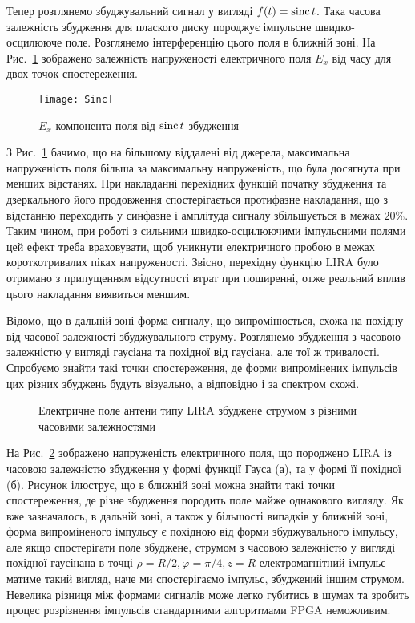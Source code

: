 Тепер розглянемо збуджувальний сигнал у вигляді $ f(t) = \operatorname{sinc} t $.
Така часова залежність збудження для плаского диску породжує імпульсне
швидко-осцилююче поле. Розглянемо інтерференцію цього поля в ближній зоні.
На Рис.~\ref{fig:ex_sinc} зображено залежність напруженості електричного 
поля $ E_x $ від часу для двох точок спостереження.

\begin{figure}[h] \begin{center}
\texttt{[image: Sinc]}
\caption{$ E_x $ компонента поля від $ \operatorname{sinc} t $ збудження}
\label{fig:ex_sinc}
\end{center} \end{figure}

З Рис.~\ref{fig:ex_sinc} бачимо, що на більшому віддалені від джерела, 
максимальна напруженість поля більша за максимальну напруженість, що була 
досягнута при менших відстанях. При накладанні перехідних функцій початку 
збудження та дзеркального його продовження спостерігається протифазне 
накладання, що з відстанню переходить у синфазне і амплітуда сигналу 
збільшується в межах $ 20\% $. Таким чином, при роботі з сильними 
швидко-осцилюючими імпульсними полями цей ефект треба враховувати, щоб 
уникнути електричного пробою в межах короткотривалих піках напруженості.
Звісно, перехідну функцію LIRA було отримано з припущенням відсутності 
втрат при поширенні, отже реальний вплив цього накладання виявиться 
меншим.

Відомо, що в дальній зоні форма сигналу, що випромінюється, схожа на похідну
від часової залежності збуджувального струму. Розглянемо збудження з 
часовою залежністю  у вигляді гаусіана та похідної від гаусіана, але тої ж 
тривалості. Спробуємо знайти такі точки спостереження, де форми 
випромінених імпульсів цих різних збуджень будуть візуально, а відповідно і 
за спектром схожі.

\begin{figure}
\caption{Електричне поле антени типу LIRA збуджене струмом з 
різними часовими залежностями}
\label{fig:gauss_shape}
\end{figure}

На Рис.~\ref{fig:gauss_shape} зображено напруженість електричного поля, 
що породжено LIRA із часовою залежністю збудження у формі функції Гауса (а), 
та у формі її похідної (б). Рисунок ілюструє, що в ближній зоні можна знайти
такі точки спостереження, де різне збудження породить поле майже однакового 
вигляду. Як вже зазначалось, в дальній зоні, а також у більшості випадків у 
ближній зоні, форма випроміненого імпульсу є похідною від форми збуджувального 
імпульсу, але якщо спостерігати поле збуджене, струмом з часовою залежністю у 
вигляді похідної гаусінана в точці $ \rho = R/2, \varphi = \pi/4, z = R $
електромагнітний імпульс матиме такий вигляд, наче ми спостерігаємо імпульс, 
збуджений іншим струмом. Невелика різниця між формами сигналів може легко 
губитись в шумах та зробить процес розрізнення імпульсів стандартними 
алгоритмами FPGA неможливим.

